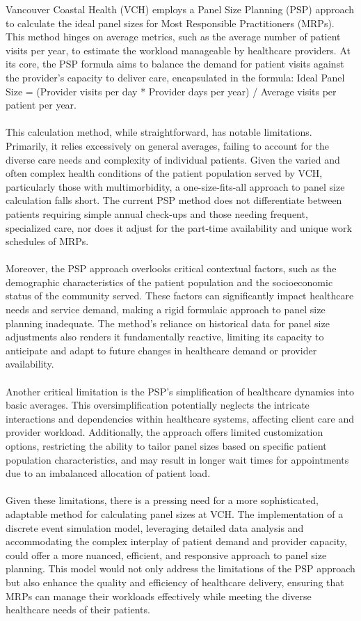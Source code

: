 \documentclass[11pt]{article}
\theoremstyle{definition}
\begin{document}
Vancouver Coastal Health (VCH) employs a Panel Size Planning (PSP) approach to calculate the ideal panel sizes for Most Responsible Practitioners (MRPs). This method hinges on average metrics, such as the average number of patient visits per year, to estimate the workload manageable by healthcare providers. At its core, the PSP formula aims to balance the demand for patient visits against the provider's capacity to deliver care, encapsulated in the formula: Ideal Panel Size = (Provider visits per day * Provider days per year) / Average visits per patient per year. \cite{PanelManagement2018} \\\\
This calculation method, while straightforward, has notable limitations. Primarily, it relies excessively on general averages, failing to account for the diverse care needs and complexity of individual patients. Given the varied and often complex health conditions of the patient population served by VCH, particularly those with multimorbidity, a one-size-fits-all approach to panel size calculation falls short. The current PSP method does not differentiate between patients requiring simple annual check-ups and those needing frequent, specialized care, nor does it adjust for the part-time availability and unique work schedules of MRPs.\\\\
Moreover, the PSP approach overlooks critical contextual factors, such as the demographic characteristics of the patient population and the socioeconomic status of the community served. These factors can significantly impact healthcare needs and service demand, making a rigid formulaic approach to panel size planning inadequate. The method's reliance on historical data for panel size adjustments also renders it fundamentally reactive, limiting its capacity to anticipate and adapt to future changes in healthcare demand or provider availability.\\\\
Another critical limitation is the PSP's simplification of healthcare dynamics into basic averages. This oversimplification potentially neglects the intricate interactions and dependencies within healthcare systems, affecting client care and provider workload. Additionally, the approach offers limited customization options, restricting the ability to tailor panel sizes based on specific patient population characteristics, and may result in longer wait times for appointments due to an imbalanced allocation of patient load.\\\\
Given these limitations, there is a pressing need for a more sophisticated, adaptable method for calculating panel sizes at VCH. The implementation of a discrete event simulation model, leveraging detailed data analysis and accommodating the complex interplay of patient demand and provider capacity, could offer a more nuanced, efficient, and responsive approach to panel size planning. This model would not only address the limitations of the PSP approach but also enhance the quality and efficiency of healthcare delivery, ensuring that MRPs can manage their workloads effectively while meeting the diverse healthcare needs of their patients.   
\end{document}
